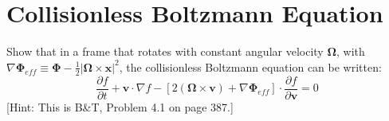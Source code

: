 \section{Collisionless Boltzmann Equation}

Show that in a frame that rotates with constant angular velocity $\mathbf{\Omega}$,
with $\nabla\mathbf{\Phi}_{eff}\equiv\mathbf{\Phi}-\frac{1}{2}|\mathbf{\Omega}\times\mathbf{x}|^2$, the collisionless Boltzmann equation can
be written:
\begin{equation}
    \frac{\partial f}{\partial t}+\mathbf{v}\cdot\nabla f - \left[2(\mathbf{\Omega}\times\mathbf{v})+\nabla\mathbf{\Phi}_{eff}\right]\cdot\frac{\partial f}{\partial \mathbf{v}}=0
\end{equation}
[Hint: This is B&T, Problem 4.1 on page 387.]



